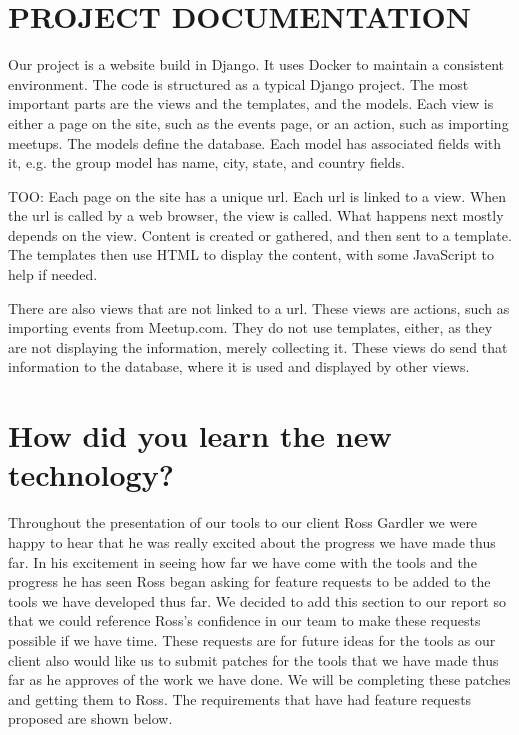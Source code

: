 \documentclass[draftclsnofoot,10pt,onecolumn]{IEEEtran} %
\begin{document}






\section{PROJECT DOCUMENTATION}
Our project is a website build in Django. It uses Docker to maintain a
consistent environment. The code is structured as a typical Django project. The
most important parts are the views and the templates, and the models. Each view
is either a page on the site, such as the events page, or an action, such as
importing meetups. The models define the database. Each model has associated
fields with it, e.g. the group model has name, city, state, and country fields.

TOO:
Each page on the site has a unique url. Each url is linked to a view. When the
url is called by a web browser, the view is called. What happens next mostly
depends on the view. Content is created or gathered, and then sent to a
template. The templates then use HTML to display the content, with some
JavaScript to help if needed.

There are also views that are not linked to a url. These views are actions, such
as importing events from Meetup.com. They do not use templates, either, as they
are not displaying the information, merely collecting it. These views do send
that information to the database, where it is used and displayed by other views.

\section{How did you learn the new technology?}
Throughout the presentation of our tools to our client Ross Gardler we were
happy to hear that he was really excited about the progress we have made thus
far.  In his excitement in seeing how far we have come with the tools and the
progress he has seen Ross began asking for feature requests to be added to the
tools we have developed thus far.  We decided to add this section to our report
so that we could reference Ross's confidence in our team to make these requests
possible if we have time.  These requests are for future ideas for the tools as
our client also would like us to submit patches for the tools that we have made
thus far as he approves of the work we have done. We will be completing these
patches and getting them to Ross.  The requirements that have had feature
requests proposed are shown below.
\end{document}
